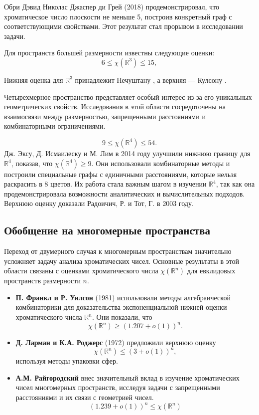 \documentclass[12pt]{article}
\begin{document}
Обри Дэвид Николас Джаспер ди Грей (2018) \cite{Grey2018} продемонстрировал, что хроматическое число плоскости не меньше 5, построив конкретный граф с соответствующими свойствами. Этот результат стал прорывом в исследовании задачи.

Для пространств большей размерности известны следующие оценки:
\[ 6 \leq \chi(\mathbb{R}^{3}) \leq 15, \]

Нижняя оценка для $\mathbb{R}^{3}$ принадлежит Нечуштану \cite{Nechushtan2002}, а верхняя — Кулсону \cite{Coulson2002}.

Четырехмерное пространство представляет особый интерес из-за его уникальных геометрических свойств. Исследования в этой области сосредоточены на взаимосвязи между размерностью, запрещенными расстояниями и комбинаторными ограничениями.

\[ 9 \leq \chi(\mathbb{R}^{4}) \leq 54. \]
  Дж. Эксу,  Д. Исмаилеску и М. Лим \cite{Exoo2014} в 2014 году улучшили нижнюю границу для $\mathbb{R}^4$, показав, что $\chi(\mathbb{R}^4) \geq 9$. Они использовали комбинаторные методы и построили специальные графы с единичными расстояниями, которые нельзя раскрасить в 8 цветов.
Их работа стала важным шагом в изучении $\mathbb{R}^4$, так как она продемонстрировала возможности аналитических и вычислительных подходов.
Верхнюю оценку доказали Радоичич, Р. и Тот, Г. в 2003 году.\cite{Rado2003}

\subsection{Обобщение на многомерные пространства}
Переход от двумерного случая к многомерным пространствам значительно усложняет задачу анализа хроматических чисел. Основные результаты в этой области связаны с оценками хроматического числа $\chi(\mathbb{R}^n)$ для евклидовых пространств размерности $n$.

\begin{itemize}
    \item \textbf{П. Франкл и Р. Уилсон} (1981) \cite{Frankl1981} использовали методы алгебраической комбинаторики для доказательства экспоненциальной нижней оценки хроматического числа $\mathbb{R}^n$. Они показали, что 
    \[
    \chi(\mathbb{R}^n) \geq (1.207 + o(1))^n.
    \]
    \item \textbf{Д. Ларман и К.А. Роджерс} (1972) \cite{Larman1972} предложили верхнюю оценку 
    \[
    \chi(\mathbb{R}^n) \leq (3 + o(1))^n,
    \]
    используя методы упаковки сфер.
    \item \textbf{А.М. Райгородский} \cite{Raygorodsky2000} внес значительный вклад в изучение хроматических чисел многомерных пространств, исследуя задачи с запрещенными расстояниями и их связи с геометрией чисел. \[(1.239 + o(1))^{n} \leq \chi(\mathbb{R}^{n})\]
\end{itemize}
\end{document}
